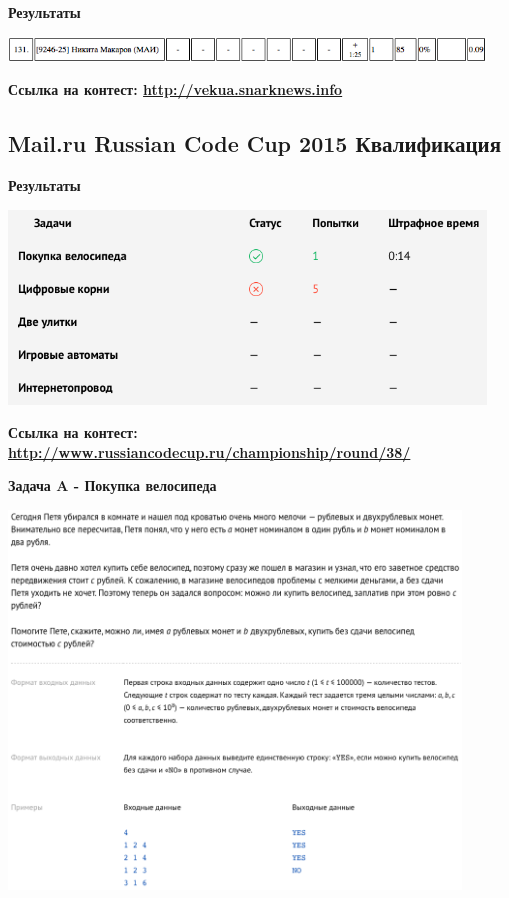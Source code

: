 \documentclass[a4paper,12pt]{article}
\begin{document}
\textbf{{\large Результаты}} \\
\begin{center}
\includegraphics[width=0.95\textwidth]{Vekua_personal/Vekua_personal_result.png}\\ [1cm]
\end{center}

\textbf{{\large Ссылка на контест: \url{http://vekua.snarknews.info}}}


%
%

\newpage
\subsection{Mail.ru Russian Code Cup 2015 Квалификация}

\textbf{{\large Результаты}} \\
\begin{center}
\includegraphics[width=0.95\textwidth]{RCC/RCC_result.png}\\ [1cm]
\end{center}

\textbf{{\large Ссылка на контест: \url{http://www.russiancodecup.ru/championship/round/38/}}}

\newpage
\textbf{{\large Задача A - Покупка велосипеда}}

\begin{center}
\includegraphics[width=0.9\textwidth]{RCC/RCC_A.png}\\ [1cm]
\end{center}
\end{document}
